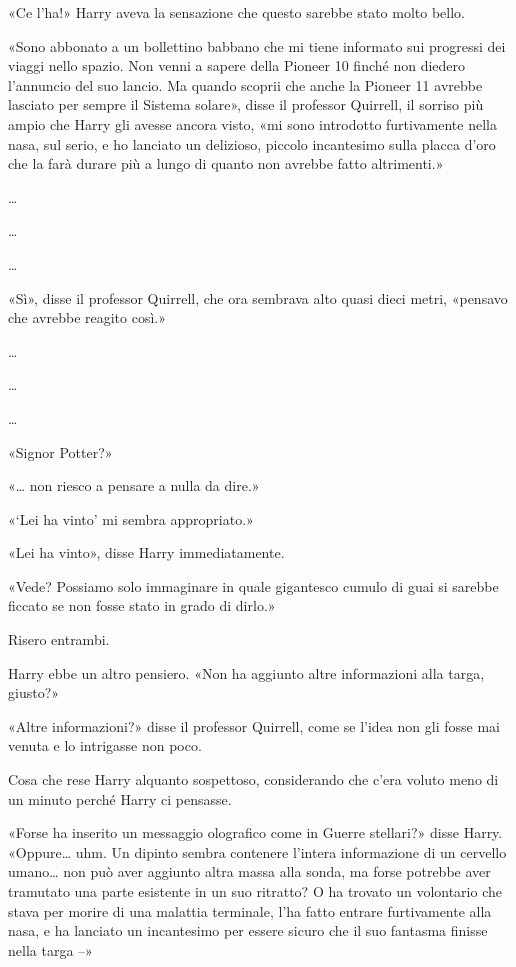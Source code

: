 «Ce l’ha!» Harry aveva la sensazione che questo sarebbe stato molto bello.

«Sono abbonato a un bollettino babbano che mi tiene informato sui progressi dei viaggi nello spazio. Non venni a sapere della Pioneer 10 finché non diedero l’annuncio del suo lancio. Ma quando scoprii che anche la Pioneer 11 avrebbe lasciato per sempre il Sistema solare», disse il professor Quirrell, il sorriso più ampio che Harry gli avesse ancora visto, «mi sono introdotto furtivamente nella nasa, sul serio, e ho lanciato un delizioso, piccolo incantesimo sulla placca d’oro che la farà durare più a lungo di quanto non avrebbe fatto altrimenti.»

…

…

…

«Sì», disse il professor Quirrell, che ora sembrava alto quasi dieci metri, «pensavo che avrebbe reagito così.»

…

…

…

«Signor Potter?»

«… non riesco a pensare a nulla da dire.»

«‘Lei ha vinto’ mi sembra appropriato.»

«Lei ha vinto», disse Harry immediatamente.

«Vede? Possiamo solo immaginare in quale gigantesco cumulo di guai si sarebbe ficcato se non fosse stato in grado di dirlo.»

Risero entrambi.

Harry ebbe un altro pensiero. «Non ha aggiunto altre informazioni alla targa, giusto?»

«Altre informazioni?» disse il professor Quirrell, come se l’idea non gli fosse mai venuta e lo intrigasse non poco.

Cosa che rese Harry alquanto sospettoso, considerando che c’era voluto meno di un minuto perché Harry ci pensasse.

«Forse ha inserito un messaggio olografico come in Guerre stellari?» disse Harry. «Oppure… uhm. Un dipinto sembra contenere l’intera informazione di un cervello umano… non può aver aggiunto altra massa alla sonda, ma forse potrebbe aver tramutato una parte esistente in un suo ritratto? O ha trovato un volontario che stava per morire di una malattia terminale, l’ha fatto entrare furtivamente alla nasa, e ha lanciato un incantesimo per essere sicuro che il suo fantasma finisse nella targa –»

